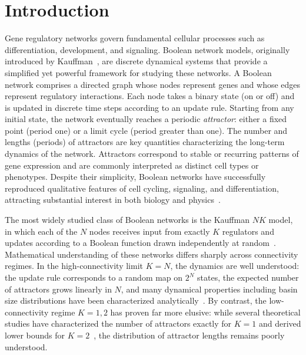 \documentclass[11pt, reqno]{elsarticle}%
\theoremstyle{plain}
\begin{document}
\maketitle


\section*{Introduction}
Gene regulatory networks govern fundamental cellular processes such as differentiation, development, and signaling. 
Boolean network models, originally introduced by Kauffman~\cite{kauffmanfirst}, are discrete dynamical systems that provide a simplified yet powerful framework for studying these networks. 
A Boolean network comprises a directed graph whose nodes represent genes and whose edges 
represent regulatory interactions.
Each node takes a binary state (on or off) and 
is updated in discrete time steps according to an update rule. 
Starting from any initial state, the network eventually reaches a periodic \emph{attractor}: either a fixed point (period one) or a limit cycle (period greater than one). 
The number and lengths (periods) of attractors are key quantities characterizing the long-term dynamics of the network.
Attractors correspond to stable or recurring patterns of gene expression and are commonly interpreted as distinct cell types or phenotypes. 
Despite their simplicity, Boolean networks have successfully reproduced qualitative features 
of cell cycling, signaling, and differentiation, attracting substantial interest in both biology and physics~\cite{wang2012boolean}.

The most widely studied class of Boolean networks is the Kauffman $NK$ model, in which each of the $N$ nodes receives input from exactly $K$ regulators and updates according to a Boolean function drawn independently at random~\cite{kauffmanfirst}. 
Mathematical understanding of these networks differs sharply across connectivity regimes. 
In the high-connectivity limit $K=N$, the dynamics are well understood: the update rule corresponds to a random map on $2^N$ states, the expected number of attractors grows linearly in $N$, and many dynamical properties including basin size distributions have been characterized 
analytically~\cite{derrida1987random}. 
By contrast, the low-connectivity regime $K=1,2$ has proven far more elusive: while several theoretical studies have characterized the number of attractors exactly for $K=1$ and derived 
lower bounds for $K=2$~\cite{flybjergexact,Drosselcriticalk1network,PhysRevE.72.016110,finkexponential,finkinsights,PhysRevLett.90.098701}, the distribution of attractor lengths remains poorly understood.
\end{document}
